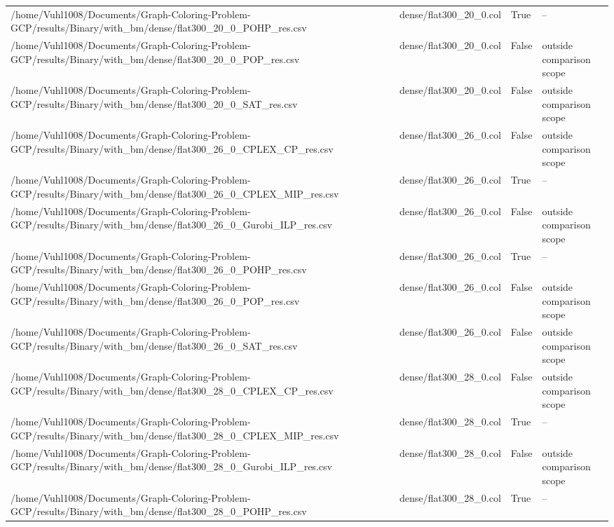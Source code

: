 \begin{table}[htbp]
\begin{tabular}{llll}
/home/Vuhl1008/Documents/Graph-Coloring-Problem-GCP/results/Binary/with\_bm/dense/flat300\_20\_0\_POHP\_res.csv & dense/flat300\_20\_0.col & True & -- \\
/home/Vuhl1008/Documents/Graph-Coloring-Problem-GCP/results/Binary/with\_bm/dense/flat300\_20\_0\_POP\_res.csv & dense/flat300\_20\_0.col & False & outside comparison scope \\
/home/Vuhl1008/Documents/Graph-Coloring-Problem-GCP/results/Binary/with\_bm/dense/flat300\_20\_0\_SAT\_res.csv & dense/flat300\_20\_0.col & False & outside comparison scope \\
/home/Vuhl1008/Documents/Graph-Coloring-Problem-GCP/results/Binary/with\_bm/dense/flat300\_26\_0\_CPLEX\_CP\_res.csv & dense/flat300\_26\_0.col & False & outside comparison scope \\
/home/Vuhl1008/Documents/Graph-Coloring-Problem-GCP/results/Binary/with\_bm/dense/flat300\_26\_0\_CPLEX\_MIP\_res.csv & dense/flat300\_26\_0.col & True & -- \\
/home/Vuhl1008/Documents/Graph-Coloring-Problem-GCP/results/Binary/with\_bm/dense/flat300\_26\_0\_Gurobi\_ILP\_res.csv & dense/flat300\_26\_0.col & False & outside comparison scope \\
/home/Vuhl1008/Documents/Graph-Coloring-Problem-GCP/results/Binary/with\_bm/dense/flat300\_26\_0\_POHP\_res.csv & dense/flat300\_26\_0.col & True & -- \\
/home/Vuhl1008/Documents/Graph-Coloring-Problem-GCP/results/Binary/with\_bm/dense/flat300\_26\_0\_POP\_res.csv & dense/flat300\_26\_0.col & False & outside comparison scope \\
/home/Vuhl1008/Documents/Graph-Coloring-Problem-GCP/results/Binary/with\_bm/dense/flat300\_26\_0\_SAT\_res.csv & dense/flat300\_26\_0.col & False & outside comparison scope \\
/home/Vuhl1008/Documents/Graph-Coloring-Problem-GCP/results/Binary/with\_bm/dense/flat300\_28\_0\_CPLEX\_CP\_res.csv & dense/flat300\_28\_0.col & False & outside comparison scope \\
/home/Vuhl1008/Documents/Graph-Coloring-Problem-GCP/results/Binary/with\_bm/dense/flat300\_28\_0\_CPLEX\_MIP\_res.csv & dense/flat300\_28\_0.col & True & -- \\
/home/Vuhl1008/Documents/Graph-Coloring-Problem-GCP/results/Binary/with\_bm/dense/flat300\_28\_0\_Gurobi\_ILP\_res.csv & dense/flat300\_28\_0.col & False & outside comparison scope \\
/home/Vuhl1008/Documents/Graph-Coloring-Problem-GCP/results/Binary/with\_bm/dense/flat300\_28\_0\_POHP\_res.csv & dense/flat300\_28\_0.col & True & -- \\

\end{tabular}
\end{table}
